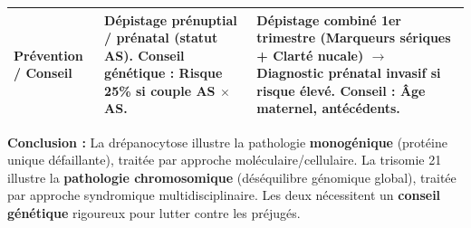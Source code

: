 \documentclass[11pt]{article}
\begin{document}
\begin{exoresolu}
\begin{center}
\begin{tabularx}{\linewidth}{|l|X|X|}
    \textbf{Prévention / Conseil} & Dépistage prénuptial / prénatal (statut AS). Conseil génétique : Risque 25\% si couple AS $\times$ AS. & Dépistage combiné 1er trimestre (Marqueurs sériques + Clarté nucale) $\rightarrow$ Diagnostic prénatal invasif si risque élevé. \newline Conseil : Âge maternel, antécédents. \\ \hline
    \end{tabularx}
    \end{center}
    \textbf{Conclusion :} La drépanocytose illustre la pathologie \textbf{monogénique} (protéine unique défaillante), traitée par approche moléculaire/cellulaire. La trisomie 21 illustre la \textbf{pathologie chromosomique} (déséquilibre génomique global), traitée par approche syndromique multidisciplinaire. Les deux nécessitent un \textbf{conseil génétique} rigoureux pour lutter contre les préjugés.
\end{exoresolu}
\end{document}
